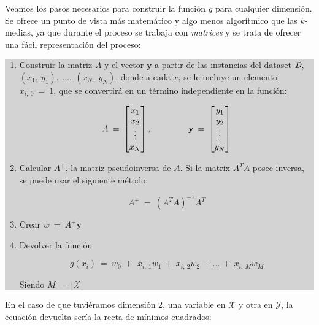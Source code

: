 Veamos los pasos necesarios para construir la función $g$ para cualquier dimensión. Se ofrece un punto de vista más matemático y algo menos algorítmico que las $k$-medias, ya que durante el proceso se trabaja con \emph{matrices} y se trata de ofrecer una fácil representación del proceso:

\noindent\colorbox{lightgray}{
\begin{minipage}{\dimexpr\textwidth-2\fboxsep}
\begin{enumerate}
\item Construir la matriz $A$ y el vector $\textbf{y}$ a partir de las instancias del dataset $\emph{D}$, $(x_{1},\:y_{1}),\:\dots,\:(x_{N},\:y_{N})$, donde a cada $x_{i}$ se le incluye un elemento $x_{i,\:0}\:=\:1$, que se convertirá en un término independiente en la función:

$$
A\:=\:\begin{bmatrix}
x_{1} \\
x_{2} \\
\vdots \\
x_{N}
\end{bmatrix},
\hspace{15mm}
\textbf{y}\:=\:\begin{bmatrix}
y_{1} \\
y_{2} \\
\vdots \\
y_{N}
\end{bmatrix}
$$

\item Calcular $A^{+}$, la matriz pseudoinversa de $A$. Si la matrix $A^{T}A$ posee inversa, se puede usar el siguiente método:

$$
A^{+}\:=\:(A^{T}A)^{-1}A^{T}
$$

\item Crear $w\:=\:A^{+}\textbf{y}$

\item Devolver la función

$$
g(x_{i})\:=\:w_{0}\:+\:\:x_{i,\:1}w_{1}\:+\:x_{i,\:2}w_{2}\:+\dots\:+\:x_{i,\:M}w_{M}
$$
\centerline{Siendo $M\:=\:|\mathcal{X}|\:\:\:\:\:\:\:\:\:\:\:\:\:\:\:\:\:\:\:$}

\end{enumerate}
\end{minipage}
}

\vspace*{3mm}

En el caso de que tuviéramos dimensión 2, una variable en $\mathcal{X}$ y otra en $\mathcal{Y}$, la ecuación devuelta sería la recta de mínimos cuadrados:

